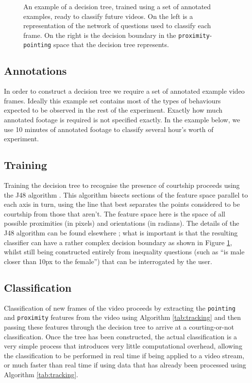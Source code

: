 \documentclass{article}
\newcommand{\var}[1]{\texttt{#1}}
\begin{document}
\begin{figure}
	\caption{An example of a decision tree, trained using a set of annotated examples, ready to classify future videos. On the left is a representation of the network of questions used to classify each frame. On the right is the decision boundary in the \var{proximity}-\var{pointing} space that the decision tree represents.}
	\label{fig:decisiontree}
\end{figure}

\subsection{Annotations}

In order to construct a decision tree we require a set of annotated example video frames. Ideally this example set contains most of the types of  behaviours expected to be observed in the rest of the experiment. Exactly how much annotated footage is required is not specified exactly. In the example below, we use 10 minutes of annotated footage to classify several hour's worth of experiment.

\subsection{Training}

Training the decision tree to recognise the presence of courtship proceeds using the J48 algorithm \cite{weka}. This algorithm bisects sections of the feature space parallel to each axis in turn, using the line that best separates the points considered to be courtship from those that aren't. The feature space here is the space of all possible proximities (in pixels) and orientations (in radians). The details of the J48 algorithm can be found elsewhere \cite{Frank}; what is important is that the resulting classifier can have a rather complex decision boundary as shown in Figure \ref{fig:decisiontree}, whilst still being constructed entirely from inequality questions (such as ``is male closer than 10px to the female'') that can be interrogated by the user.

\subsection{Classification}

Classification of new frames of the video proceeds by extracting the \var{pointing} and \var{proximity} features from the video using Algorithm \ref{tab:tracking} and then passing these features through the decision tree to arrive at a courting-or-not classification. Once the tree has been constructed, the actual classification is a very simple process that introduces very little computational overhead, allowing the classification to be performed in real time if being applied to a video stream, or much faster than real time if using data that has already been processed using Algorithm \ref{tab:tracking}.
\end{document}
